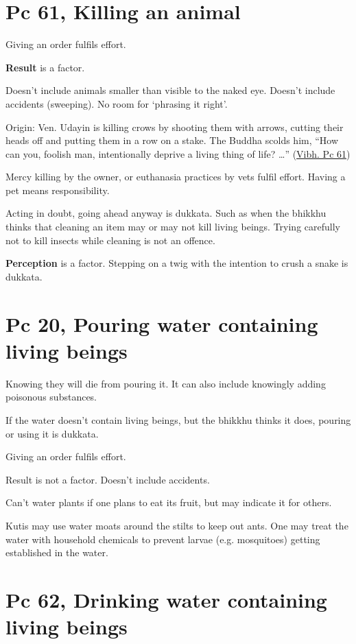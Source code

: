 \section{Pc 61, Killing an animal}

Giving an order fulfils effort.

\textbf{Result} is a factor.

Doesn't include animals smaller than visible to the naked eye. Doesn't
include accidents (sweeping). No room for `phrasing it right'.

Origin: Ven. Udayin is killing crows by shooting them with arrows,
cutting their heads off and putting them in a row on a stake. The Buddha
scolds him, ``How can you, foolish man, intentionally deprive a living
thing of life? \ldots{}''
(\href{https://suttacentral.net/pli-tv-bu-vb-pc61/en/horner}{Vibh. Pc
61})

Mercy killing by the owner, or euthanasia practices by vets fulfil
effort. Having a pet means responsibility.

Acting in doubt, going ahead anyway is dukkata. Such as when the bhikkhu
thinks that cleaning an item may or may not kill living beings. Trying
carefully not to kill insects while cleaning is not an offence.

\textbf{Perception} is a factor. Stepping on a twig with the intention
to crush a snake is dukkata.

\section{Pc 20, Pouring water containing living beings}

Knowing they will die from pouring it. It can also include knowingly
adding poisonous substances.

If the water doesn't contain living beings, but the bhikkhu thinks it
does, pouring or using it is dukkata.

Giving an order fulfils effort.

Result is not a factor. Doesn't include accidents.

Can't water plants if one plans to eat its fruit, but may indicate it
for others.

Kutis may use water moats around the stilts to keep out ants. One may
treat the water with household chemicals to prevent larvae (e.g.
mosquitoes) getting established in the water.

\section{Pc 62, Drinking water containing living beings}


